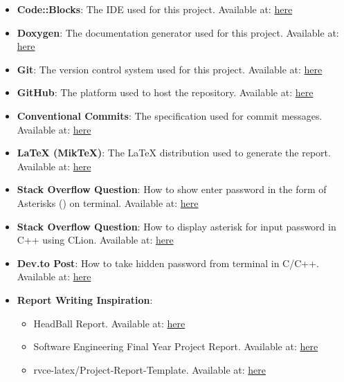\documentclass[12pt,a4paper]{report}
\begin{document}
\begin{itemize}
    \item \textbf{Code::Blocks}: The IDE used for this project. Available at: \href{http://www.codeblocks.org/}{here}
    \item \textbf{Doxygen}: The documentation generator used for this project. Available at: \href{https://www.doxygen.nl/}{here}
    \item \textbf{Git}: The version control system used for this project. Available at: \href{https://git-scm.com/}{here}
    \item \textbf{GitHub}: The platform used to host the repository. Available at: \href{https://github.com/}{here}
    \item \textbf{Conventional Commits}: The specification used for commit messages. Available at: \href{https://www.conventionalcommits.org/en/v1.0.0/}{here}
    \item \textbf{LaTeX (MikTeX)}: The LaTeX distribution used to generate the report. Available at: \href{https://miktex.org/}{here}
    \item \textbf{Stack Overflow Question}: How to show enter password in the form of Asterisks (\*) on terminal. Available at: \href{https://stackoverflow.com/questions/25990966/how-to-show-enter-password-in-the-form-of-asterisks-on-terminal}{here}
    \item \textbf{Stack Overflow Question}: How to display asterisk for input password in C++ using CLion. Available at: \href{https://stackoverflow.com/questions/41652182/how-to-display-asterisk-for-input-password-in-c-using-clion}{here}
    \item \textbf{Dev.to Post}: How to take hidden password from terminal in C/C++. Available at: \href{https://dev.to/namantam1/how-to-take-hidden-password-from-terminal-in-cc-3ddd}{here}
    \item \textbf{Report Writing Inspiration}:
    \begin{itemize}
        \item HeadBall Report. Available at: \href{https://raw.githubusercontent.com/RujalAcharya/HeadBall/main/project_report.pdf}{here}
        \item Software Engineering Final Year Project Report. Available at: \href{https://www.slideshare.net/judebwayo/software-engineering-final-year-project-report}{here}
        \item rvce-latex/Project-Report-Template. Available at: \href{https://github.com/rvce-latex/Project-Report-Template/blob/main/Main.pdf}{here}
    \end{itemize}
\end{itemize}
\end{document}

